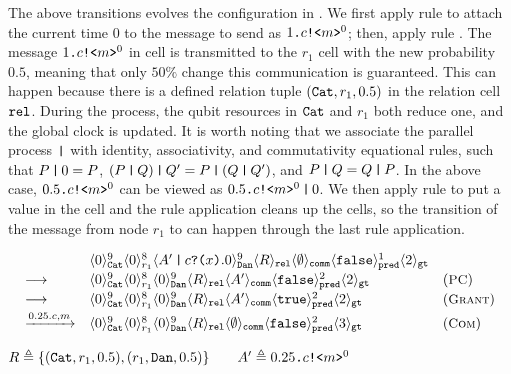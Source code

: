 The above transitions evolves the configuration in . We first apply rule  to attach the current time $0$ to the message to send as $1\texttt{.}c\texttt{!<}m\texttt{>}^0$; then, apply rule . The message $1\texttt{.}c\texttt{!<}m\texttt{>}^0$ in cell  is transmitted to the $r_1$ cell with the new probability $0.5$, meaning that only $50\%$ change this communication is guaranteed.
This can happen because there is a defined relation tuple $(\texttt{Cat},r_1,0.5)$ in the relation cell $\texttt{rel}$. During the process, the qubit resources in $\texttt{Cat}$ and $r_1$ both reduce one, and the global clock is updated. 
It is worth noting that 
we associate the parallel process $\texttt{|}$ with identity, associativity, and commutativity equational rules, 
such that $P\,\texttt{|}\,0=P$, $(P\,\texttt{|}\,Q)\,\texttt{|}\,Q'=P\,\texttt{|}\,(Q\,\texttt{|}\,Q')$, and $P\,\texttt{|}\,Q=Q\,\texttt{|}\,P$.
In the above case, $0.5\texttt{.}c\texttt{!<}m\texttt{>}^0$ can be viewed as $0.5\texttt{.}c\texttt{!<}m\texttt{>}^0\,\texttt{|}\,0$.
We then apply rule  to put a  value in the  cell and the  rule application cleans up the cells, so the transition of the message from node $r_1$ to  can happen through the last  rule application.

{\footnotesize
\[
\begin{array}{lll}
&\langle 0 \rangle^{9}_{\texttt{Cat}}\langle 0 \rangle^{8}_{r_1}
\langle A'\,\texttt{|}\,c\texttt{?(}x\texttt{)}.0 \rangle^{9}_{\texttt{Dan}} 
\langle R \rangle_{\texttt{rel}}
\langle \emptyset \rangle_{\texttt{comm}}
\langle \texttt{false} \rangle^{1}_{\texttt{pred}}
\langle 2 \rangle_{\texttt{gt}}
\\[0.2em]
\longrightarrow
&
\langle 0 \rangle^{9}_{\texttt{Cat}}\langle 0 \rangle^{8}_{r_1}
\langle 0 \rangle^{9}_{\texttt{Dan}} 
\langle R \rangle_{\texttt{rel}}
\langle A' \rangle_{\texttt{comm}}
\langle \texttt{false} \rangle^{2}_{\texttt{pred}}
\langle 2 \rangle_{\texttt{gt}}
&
({\small \textsc{PC}})
\\[0.2em]
\longrightarrow
&
\langle 0 \rangle^{9}_{\texttt{Cat}}\langle 0 \rangle^{8}_{r_1}
\langle 0 \rangle^{9}_{\texttt{Dan}} 
\langle R \rangle_{\texttt{rel}}
\langle A' \rangle_{\texttt{comm}}
\langle \texttt{true} \rangle^{2}_{\texttt{pred}}
\langle 2 \rangle_{\texttt{gt}}
&
({\small \textsc{Grant}})
\\[0.2em]
\xrightarrow{0.25.c,m}
&
\langle 0 \rangle^{9}_{\texttt{Cat}}\langle 0 \rangle^{8}_{r_1}
\langle 0 \rangle^{9}_{\texttt{Dan}} 
\langle R \rangle_{\texttt{rel}}
\langle \emptyset \rangle_{\texttt{comm}}
\langle \texttt{false} \rangle^{2}_{\texttt{pred}}
\langle 3 \rangle_{\texttt{gt}}
&
({\small \textsc{Com}})
\end{array}
\]
}
{\footnotesize
\begin{center}
$R\triangleq\{(\texttt{Cat},r_1,0.5), (r_1,\texttt{Dan},0.5)\}
\qquad
A'\triangleq0.25\texttt{.}c\texttt{!<}m\texttt{>}^0$
\end{center}
}


